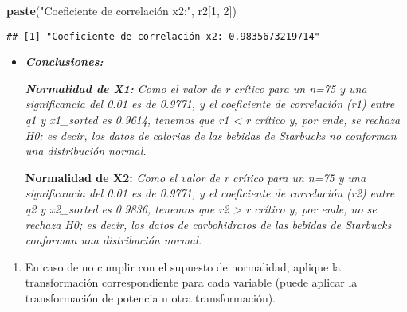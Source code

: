 \documentclass[
]{article}
\newenvironment{Shaded}{\begin{snugshade}}{\end{snugshade}}
\newcommand{\DecValTok}[1]{\textcolor[rgb]{0.00,0.00,0.81}{#1}}
\newcommand{\FunctionTok}[1]{\textcolor[rgb]{0.13,0.29,0.53}{\textbf{#1}}}
\newcommand{\NormalTok}[1]{#1}
\newcommand{\StringTok}[1]{\textcolor[rgb]{0.31,0.60,0.02}{#1}}
\providecommand{\tightlist}{%
  \setlength{\itemsep}{0pt}\setlength{\parskip}{0pt}}
\begin{document}
\begin{Shaded}
\begin{Highlighting}[]
\FunctionTok{paste}\NormalTok{(}\StringTok{"Coeficiente de correlación x2:"}\NormalTok{, r2[}\DecValTok{1}\NormalTok{, }\DecValTok{2}\NormalTok{])}
\end{Highlighting}
\end{Shaded}

\begin{verbatim}
## [1] "Coeficiente de correlación x2: 0.9835673219714"
\end{verbatim}

\begin{itemize}
\item
  \textbf{\emph{Conclusiones:}}

  \emph{\textbf{Normalidad de X1:} Como el valor de r crítico para un
  n=75 y una significancia del 0.01 es de 0.9771, y el coeficiente de
  correlación (r1) entre q1 y x1\_sorted es 0.9614, tenemos que r1
  \textless{} r crítico y, por ende, se rechaza H0; es decir, los datos
  de calorias de las bebidas de Starbucks no conforman una distribución
  normal.}

  \textbf{Normalidad de X2:} \emph{Como el valor de r crítico para un
  n=75 y una significancia del 0.01 es de 0.9771, y el coeficiente de
  correlación (r2) entre q2 y x2\_sorted es 0.9836, tenemos que r2
  \textgreater{} r crítico y, por ende, no se rechaza H0; es decir, los
  datos de carbohidratos de las bebidas de Starbucks conforman una
  distribución normal.}
\end{itemize}

\begin{enumerate}
\def\labelenumi{\arabic{enumi}.}
\setcounter{enumi}{1}
\tightlist
\item
  En caso de no cumplir con el supuesto de normalidad, aplique la
  transformación correspondiente para cada variable (puede aplicar la
  transformación de potencia u otra transformación).
\end{enumerate}
\end{document}
